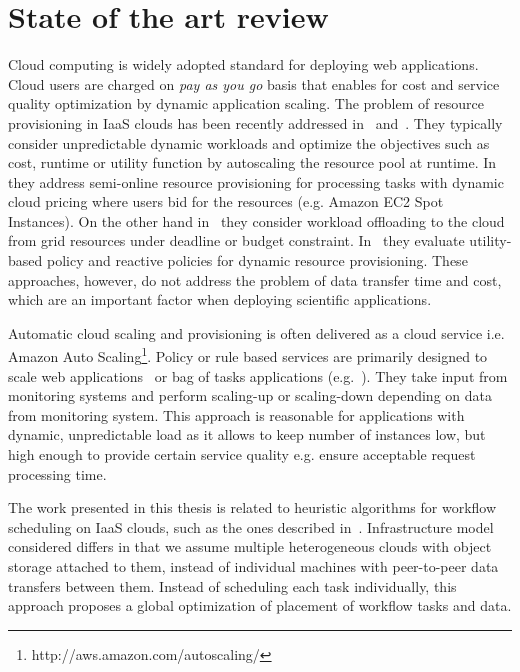 \chapter{State of the art review} \label{chap:state-of-art}  
 
Cloud computing is widely adopted standard for deploying web applications. Cloud users are charged on \emph{pay as you go} basis that enables for cost and service quality optimization by dynamic application scaling. The problem of resource provisioning in IaaS clouds has been recently addressed in~\cite{Chen2011, Kim2011} and~\cite{SqueezingOut}. They typically consider unpredictable dynamic workloads and optimize the objectives such as cost, runtime or utility function by autoscaling the resource pool at runtime. In~\cite{Chen2011} they address semi-online resource provisioning for processing tasks with dynamic cloud pricing where users bid for the resources (e.g. Amazon EC2 Spot Instances).  On the other hand in~\cite{Kim2011} they consider workload offloading to the cloud from grid resources under deadline or budget constraint. In~\cite{SqueezingOut} they evaluate utility-based policy and reactive policies for dynamic resource provisioning. These approaches, however, do not address the problem of data transfer time and cost, which are an important factor when deploying scientific applications.

Automatic cloud scaling and provisioning is often delivered as a cloud service i.e. Amazon Auto Scaling\footnote{http://aws.amazon.com/autoscaling/}. Policy or rule based services are primarily designed to scale web applications~\cite{SqueezingOut} or bag of tasks applications (e.g.~\cite{ElasticSite, Kim2011}). They take input from monitoring systems and perform scaling-up or scaling-down depending on data from monitoring system. This approach is reasonable for applications with dynamic, unpredictable load as it allows to keep number of instances low, but high enough to provide certain service quality e.g. ensure acceptable request processing time.

The work presented in this thesis is related to heuristic algorithms for workflow scheduling on IaaS clouds, such as the ones described in~\cite{Abrishami2013158,Mao11,BarrionuevoFP12,BittencourtM11}.  Infrastructure model considered differs in that we assume multiple heterogeneous clouds with object storage attached to them, instead of individual machines with peer-to-peer data transfers between them. Instead of scheduling each task individually, this approach proposes a global optimization of placement of workflow tasks and data.


